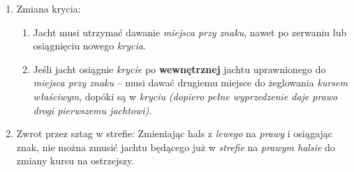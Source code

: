 \documentclass[12pt,a4paper]{article}
\begin{document}
\begin{enumerate}
\begin{enumerate}
\begin{enumerate}
        \end{enumerate}
        \item Zmiana krycia:
        \begin{enumerate}
            \item Jacht musi utrzymać dawanie \textit{miejsca przy znaku}, nawet po zerwaniu lub osiągnięciu nowego \textit{krycia}.
            \item Jeśli jacht osiągnie \textit{krycie} po \textbf{wewnętrznej} jachtu uprawnionego do \textit{miejsca przy znaku} -- musi dawać drugiemu miejsce do żeglowania \textit{kursem właściwym}, dopóki są w \textit{kryciu} \textit{(dopiero pełne wyprzedzenie daje prawo drogi pierwszemu jachtowi)}. 
        \end{enumerate}
        \item Zwrot przez sztag w strefie: Zmieniając hals z \textit{lewego} na \textit{prawy} i osiągając znak, nie można zmusić jachtu będącego już w \textit{strefie} na \textit{prawym halsie} do zmiany kursu na ostrzejszy.
    \end{enumerate}
\end{enumerate}
\end{document}

